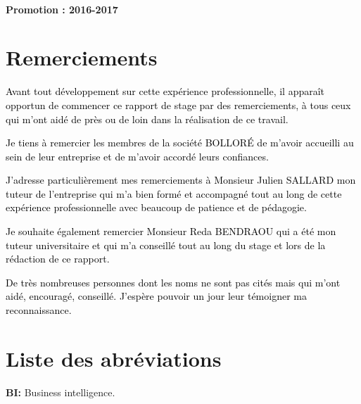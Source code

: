 \documentclass[a4paper,12pt]{report}
\begin{document}
		\vskip 0.1in
		
		\begin{tabular}{llllllllll}
	
		\end{tabular}
		
		~~\\
		\vskip 0.3in
		\begin{center}
			\vspace{0.3cm} \textbf{Promotion : 2016-2017}
		\end{center}
	\newpage
	

\chapter*{Remerciements}


\textcolor{black}{Avant tout développement sur cette expérience professionnelle, il apparaît opportun de commencer ce rapport de stage par des remerciements, à tous ceux qui m’ont aidé de près ou de loin dans la réalisation de ce travail.}

\textcolor{black}{Je tiens à remercier les membres de la société BOLLORÉ de m’avoir accueilli au sein de leur entreprise et de m’avoir accordé leurs confiances.}

\textcolor{black}{J’adresse particulièrement mes remerciements à Monsieur Julien SALLARD mon tuteur de l’entreprise qui m’a bien formé et accompagné tout au long de cette expérience professionnelle avec beaucoup de patience et de pédagogie.}

\textcolor{black}{Je souhaite également remercier Monsieur Reda BENDRAOU qui a été mon tuteur universitaire et qui m’a conseillé tout au long du stage et lors de la rédaction de ce rapport.}

\textcolor{black}{De très nombreuses personnes dont les noms ne sont pas cités mais qui m’ont aidé, encouragé, conseillé. J’espère pouvoir un jour leur témoigner ma reconnaissance.}



\newpage
\tableofcontents
\listoffigures
{}

\newpage
\chapter*{Liste des abréviations}

\textbf{BI: }Business intelligence.
\end{document}
